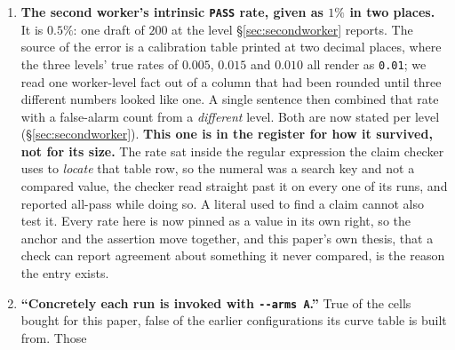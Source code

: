\documentclass[11pt]{article}
\begin{document}
\begin{enumerate}
    \S\ref{sec:curverepeat} said the borrowed-denominator ratios needed ``only $5\%$ more $\sigma$''
    ($11\%$, $14\%$) to fall under the $2\sigma$ line. Those three reproduce only under the
    \emph{population}-sd $\sigma = 0.0286$ the correction retired; under the $\sigma = 0.0291$ this
    paper divides by, the margins are $3\%$, $9\%$ and $12\%$. This is the second site
    ``corrected throughout'' missed, after the $1.12$ of Paper~I's register, and the two share a
    signature: a value derived from $\sigma$ rather than printed as $\sigma$, so a search for the
    denominator does not find it. Like the first, it erred in the flattering direction: it made
    the ratios look \emph{less} fragile than they are, which is the opposite of what the paragraph
    argues, so the corrected figures strengthen the case for having bought the direct measurement.
    All three are now derived from the same \texttt{\_curve\_gap} ratios the surrounding prose
    pins, so a future change of denominator moves them with everything else.
  \item \textbf{The second worker's intrinsic \texttt{PASS} rate, given as $1\%$ in two places.}
    It is $0.5\%$: one draft of $200$ at the level \S\ref{sec:secondworker} reports. The
    source of the error is a calibration table printed at two decimal places, where the three
    levels' true rates of $0.005$, $0.015$ and $0.010$ all render as \texttt{0.01}; we read one
    worker-level fact out of a column that had been rounded until three different numbers looked
    like one. A single sentence then combined that rate with a false-alarm count from a
    \emph{different} level. Both are now stated per level (\S\ref{sec:secondworker}).
    \textbf{This one is in the register for how it survived, not for its size.} The rate sat
    inside the regular expression the claim checker uses to \emph{locate} that table row, so the
    numeral was a search key and not a compared value, the checker read straight past it on
    every one of its runs, and reported all-pass while doing so. A literal used to find a claim
    cannot also test it. Every rate here is now pinned as a value in its own right, so the anchor
    and the assertion move together, and this paper's own thesis, that a check can report
    agreement about something it never compared, is the reason the entry exists.
  \item \textbf{``Concretely each run is invoked with \texttt{-{}-arms A}.''} True of the cells
    bought for this paper, false of the earlier configurations its curve table is built from. Those

\end{enumerate}
\end{document}
